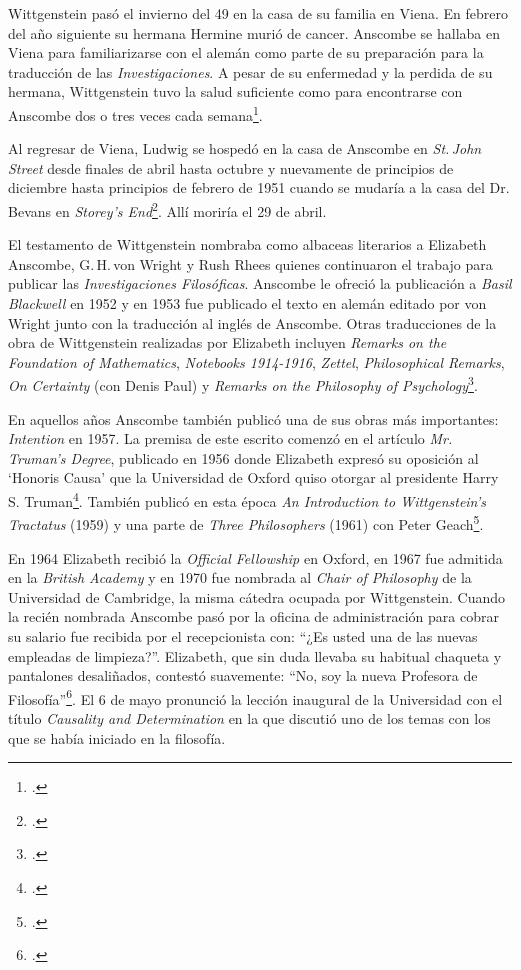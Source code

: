 Wittgenstein pasó el invierno del 49 en la casa de su familia en Viena. En febrero del año siguiente su hermana Hermine murió de cancer. Anscombe se hallaba en Viena para familiarizarse con el alemán como parte de su preparación para la traducción de las \emph{Investigaciones}. A pesar de su enfermedad y la perdida de su hermana, Wittgenstein tuvo la salud suficiente como para encontrarse con Anscombe dos o tres veces cada semana\footcite[Cf.][562]{monk1991duty}.

Al regresar de Viena, Ludwig se hospedó en la casa de Anscombe en \emph{St.\,John Street} desde finales de abril hasta octubre y nuevamente de principios de diciembre hasta principios de febrero de 1951 cuando se mudaría a la casa del Dr.\,Bevans en \emph{Storey's End}\footcite[Cf.][567]{monk1991duty}. Allí moriría el 29 de abril.

El testamento de Wittgenstein nombraba como albaceas literarios a Elizabeth Anscombe, G.\,H.\,von Wright y Rush Rhees quienes continuaron el trabajo para publicar las \emph{Investigaciones Filosóficas}. Anscombe le ofreció la publicación a \emph{Basil Blackwell} en 1952 y en 1953 fue publicado el texto en alemán editado por von Wright junto con la traducción al inglés de Anscombe. Otras traducciones de la obra de Wittgenstein realizadas por Elizabeth incluyen \emph{Remarks on the Foundation of Mathematics}, \emph{Notebooks 1914-1916}, \emph{Zettel}, \emph{Philosophical Remarks}, \emph{On Certainty} (con Denis Paul) y \emph{Remarks on the Philosophy of Psychology}\footcite[Cf.][38]{teichman2002fellows}.

En aquellos años Anscombe también publicó una de sus obras más importantes: \emph{Intention} en 1957. La premisa de este escrito comenzó en el artículo \emph{Mr. Truman's Degree}, publicado en 1956 donde Elizabeth expresó su oposición al `Honoris Causa' que la Universidad de Oxford quiso otorgar al presidente Harry S. Truman\footcite[Cf.][101]{grimi2014dl}. También publicó en esta época \emph{An Introduction to Wittgenstein's Tractatus} (1959) y una parte de \emph{Three Philosophers} (1961) con Peter Geach\footcite[Cf.][39]{teichman2002fellows}.

En 1964 Elizabeth recibió la \emph{Official Fellowship} en Oxford, en 1967 fue admitida en la \emph{British Academy} y en 1970 fue nombrada al \emph{Chair of Philosophy} de la Universidad de Cambridge, la misma cátedra ocupada por Wittgenstein. Cuando la recién nombrada Anscombe pasó por la oficina de administración para cobrar su salario fue recibida por el recepcionista con: \enquote{¿Es usted una de las nuevas empleadas de limpieza?}. Elizabeth, que sin duda llevaba su habitual chaqueta y pantalones desaliñados, contestó suavemente: \enquote{No, soy la nueva Profesora de Filosofía}\footcite[Cf.][37]{teichman2002fellows}. El 6 de mayo pronunció la lección inaugural de la Universidad con el título \emph{Causality and Determination} en la que discutió uno de los temas con los que se había iniciado en la filosofía.

